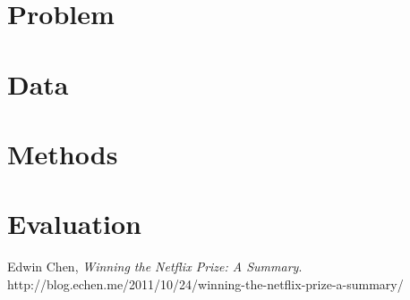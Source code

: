 \documentclass[12pt]{article}
\begin{document}

\section{Problem}

\newcommand{\bestRSS}{???}
\newcommand{\bestRMSE}{???}
\newcommand{\bestNetflixRMSE}{0.88}

\section{Data}


\section{Methods}


\section{Evaluation}



\begin{thebibliography}{9}

  Edwin Chen,
  \emph{Winning the Netflix Prize: A Summary}.
  http://blog.echen.me/2011/10/24/winning-the-netflix-prize-a-summary/
\end{thebibliography}
\end{document}
